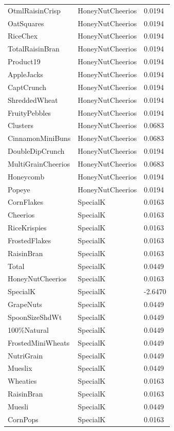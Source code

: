 \begin{table}[!htbp]
\begin{tabular}{lll}
\\
OtmlRaisinCrisp & HoneyNutCheerios & 0.0194
\\
OatSquares & HoneyNutCheerios & 0.0194
\\
RiceChex & HoneyNutCheerios & 0.0194
\\
TotalRaisinBran & HoneyNutCheerios & 0.0194
\\
Product19 & HoneyNutCheerios & 0.0194
\\
AppleJacks & HoneyNutCheerios & 0.0194
\\
CaptCrunch & HoneyNutCheerios & 0.0194
\\
ShreddedWheat & HoneyNutCheerios & 0.0194
\\
FruityPebbles & HoneyNutCheerios & 0.0194
\\
Clusters & HoneyNutCheerios & 0.0683
\\
CinnamonMiniBuns & HoneyNutCheerios & 0.0683
\\
DoubleDipCrunch & HoneyNutCheerios & 0.0194
\\
MultiGrainCheerios & HoneyNutCheerios & 0.0683
\\
Honeycomb & HoneyNutCheerios & 0.0194
\\
Popeye & HoneyNutCheerios & 0.0194
\\
CornFlakes & SpecialK & 0.0163
\\
Cheerios & SpecialK & 0.0163
\\
RiceKrispies & SpecialK & 0.0163
\\
FrostedFlakes & SpecialK & 0.0163
\\
RaisinBran & SpecialK & 0.0163
\\
Total & SpecialK & 0.0449
\\
HoneyNutCheerios & SpecialK & 0.0163
\\
SpecialK & SpecialK & -2.6470
\\
GrapeNuts & SpecialK & 0.0449
\\
SpoonSizeShdWt & SpecialK & 0.0449
\\
100\%Natural & SpecialK & 0.0449
\\
FrostedMiniWheats & SpecialK & 0.0449
\\
NutriGrain & SpecialK & 0.0449
\\
Mueslix & SpecialK & 0.0449
\\
Wheaties & SpecialK & 0.0163
\\
RaisinBran & SpecialK & 0.0163
\\
Muesli & SpecialK & 0.0449
\\
CornPops & SpecialK & 0.0163
\\

\end{tabular}
\end{table}
